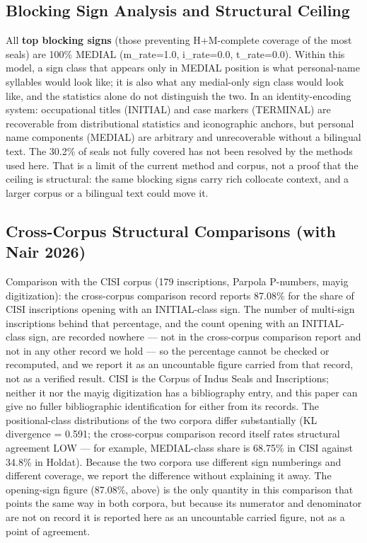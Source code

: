 \documentclass[11pt]{article}
\begin{document}
\subsection{Blocking Sign Analysis and Structural Ceiling
}\label{blocking-sign-analysis-and-structural-ceiling-phase-144}

All \textbf{top blocking signs} (those preventing H+M-complete coverage of the most seals) are 100\% MEDIAL (m\_rate=1.0, i\_rate=0.0,
t\_rate=0.0). Within this model, a sign class that appears only in MEDIAL position is what personal-name syllables would look like; it is also what any medial-only sign class would look like, and the statistics alone do not distinguish the two. In an identity-encoding system: occupational titles (INITIAL) and case
markers (TERMINAL) are recoverable from distributional statistics and
iconographic anchors, but personal name components (MEDIAL) are
arbitrary and unrecoverable without a bilingual text. The 30.2\% of seals not fully covered has not been resolved by the methods used here. That is a limit of the current method and corpus, not a proof that the ceiling is structural: the same blocking signs carry rich collocate context, and a larger corpus or a bilingual text could move it.

\subsection{Cross-Corpus Structural Comparisons (with Nair 2026)}\label{cross-corpus-structural-validation-phase-145-nair-2026}

Comparison with the CISI corpus (179 inscriptions, Parpola P-numbers, mayig digitization): the cross-corpus comparison record reports 87.08\% for the share of CISI inscriptions opening with an INITIAL-class sign. The number of multi-sign inscriptions behind that percentage, and the count opening with an INITIAL-class sign, are recorded nowhere --- not in the cross-corpus comparison report and not in any other record we hold --- so the percentage cannot be checked or recomputed, and we report it as an uncountable figure carried from that record, not as a verified result. CISI is the Corpus of Indus Seals and Inscriptions; neither it nor the mayig digitization has a bibliography entry, and this paper can give no fuller bibliographic identification for either from its records. The positional-class distributions of the two corpora differ substantially (KL divergence = 0.591; the cross-corpus comparison record itself rates structural agreement LOW --- for example, MEDIAL-class share is 68.75\% in CISI against 34.8\% in Holdat). Because the two corpora use different sign numberings and different coverage, we report the difference without explaining it away. The opening-sign figure (87.08\%, above) is the only quantity in this comparison that points the same way in both corpora, but because its numerator and denominator are not on record it is reported here as an uncountable carried figure, not as a point of agreement.
\end{document}
